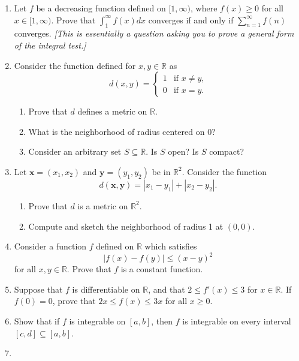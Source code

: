 \documentclass[12pt]{article}
\newcommand{\Q}{\mathbb{Q}}
\newcommand{\R}{\mathbb{R}}
\renewcommand{\vec}[1]{\mathbf{#1}}
\begin{document}
\begin{enumerate}
\[\begin{array}{ll}
      0 & \qquad \textrm{for $x\notin \Q$.}
    \end{array}
    \right.
    \]
    Consider a partition $P=\{0=t_0<t_1<\ldots<t_n=b\}$. What are the upper and
    lower Darboux sums $U(f,P)$ and $L(f,P)$? Is $f$ integrable on $[0,b]$?
  \item Let $f$ be a decreasing function defined on $[1,\infty)$, where
    $f(x)\ge 0$ for all $x\in [1,\infty)$. Prove that $\int_1^\infty f(x)dx$
    converges if and only if $\sum_{n=1}^\infty f(n)$ converges. {\it [This
    is essentially a question asking you to prove a general form of the
    integral test.]}
  \item Consider the function defined for $x,y\in \R$ as
    \[
    d(x,y) = \left\{
    \begin{array}{ll}
      1 & \textrm{if $x\ne y$,} \\
      0 & \textrm{if $x=y$.}
    \end{array}
    \right.
    \]
    \begin{enumerate}
      \item Prove that $d$ defines a metric on $\R$.
      \item What is the neighborhood of radius  centered on 0?
      \item Consider an arbitrary set $S\subseteq \R$. Is $S$ open? Is $S$ compact?
    \end{enumerate}
  \item Let $\vec{x}=(x_1,x_2)$ and $\vec{y}=(y_1,y_2)$ be in $\R^2$. Consider
    the function
    \[
    d(\vec{x},\vec{y}) = |x_1-y_1| + |x_2-y_2|.
    \]
    \begin{enumerate}
      \item Prove that $d$ is a metric on $\R^2$.
      \item Compute and sketch the neighborhood of radius 1 at $(0,0)$.
    \end{enumerate}
  \item Consider a function $f$ defined on $\R$ which satisfies
    \[
    |f(x)-f(y)|\le(x-y)^2
    \]
    for all $x,y\in \R$. Prove that $f$ is a constant function.
  \item Suppose that $f$ is differentiable on $\R$, and that $2\le f'(x) \le 3$
    for $x\in \R$. If $f(0)=0$, prove that $2x \le f(x) \le 3x$ for all $x\ge
    0$.
  \item Show that if $f$ is integrable on $[a,b]$, then $f$ is integrable on
    every interval $[c,d]\subseteq[a,b]$.
  \item
    \begin{enumerate}

\end{enumerate}
\end{enumerate}
\end{document}
